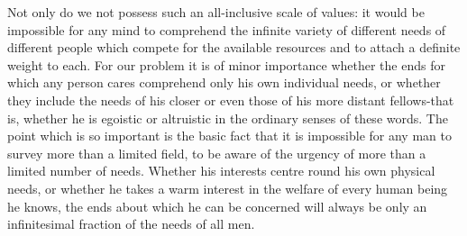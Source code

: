 \documentclass[11pt,openany]{book}
\begin{document}
\begin{center}\textasteriskcentered\hspace{0.9em}\textasteriskcentered\hspace{0.9em}\textasteriskcentered\end{center}

\begin{center}\textasteriskcentered\hspace{0.9em}\textasteriskcentered\hspace{0.9em}\textasteriskcentered\end{center}

\begin{center}\textasteriskcentered\hspace{0.9em}\textasteriskcentered\hspace{0.9em}\textasteriskcentered\end{center}

\begin{center}\textasteriskcentered\hspace{0.9em}\textasteriskcentered\hspace{0.9em}\textasteriskcentered\end{center}

Not only do we not possess such an all-inclusive scale of values: it would be impossible for any mind to comprehend the infinite variety of different needs of different people which compete for the available resources and to attach a definite weight to each. For our problem it is of minor importance whether the ends for which any person cares comprehend only his own individual needs, or whether they include the needs of his closer or even those of his more distant fellows-that is, whether he is egoistic or altruistic in the ordinary senses of these words. The point which is so important is the basic fact that it is impossible for any man to survey more than a limited field, to be aware of the urgency of more than a limited number of needs. Whether his interests centre round his own physical needs, or whether he takes a warm interest in the welfare of every human being he knows, the ends about which he can be concerned will always be only an infinitesimal fraction of the needs of all men.
\end{document}
